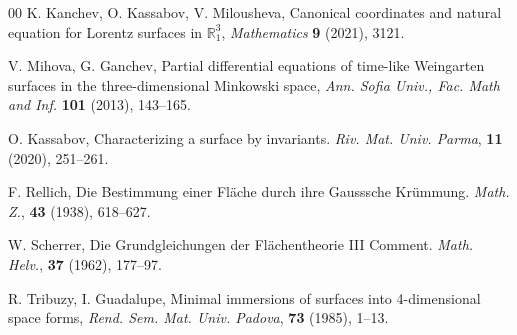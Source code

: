 \documentclass[12pt]{amsart}
\theoremstyle{definition}
\theoremstyle{remark}
\begin{document}
\begin{thebibliography}{00}
 {\sc K. Kanchev, O. Kassabov, V. Milousheva}, Canonical coordinates and natural equation for Lorentz
surfaces in $\mathbb R^3_1$, {\it Mathematics} {\bf 9} (2021), 3121.


 {\sc V. Mihova, G. Ganchev}, Partial differential equations of time-like Weingarten surfaces 
in the three-dimensional Minkowski space, {\it Ann. Sofia Univ., Fac. Math and Inf.} {\bf 101} (2013), 143--165.

 {\sc O. Kassabov}, Characterizing a surface by invariants. {\it Riv. Mat. Univ. Parma}, {\bf 11} (2020), 251--261.

 {\sc F. Rellich},  Die Bestimmung einer Fl\"ache durch ihre Gausssche Kr\"ummung. {\it Math. Z.}, 
{\bf 43} (1938), 618--627.

 {\sc W. Scherrer},  Die Grundgleichungen der Fl\"achentheorie III Comment. {\it Math. Helv.}, 
{\bf 37} (1962), 177--97.


 {\sc R. Tribuzy, I. Guadalupe}, Minimal immersions of surfaces into 4-dimensional space forms,
{\it Rend. Sem. Mat. Univ. Padova}, {\bf 73} (1985), 1--13.




\end{thebibliography}
\end{document}
